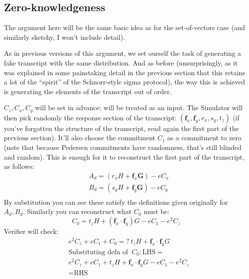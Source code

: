 \documentclass[10pt,a4paper]{article}
\begin{document}
\hypertarget{zero-knowledgeness}{%
\subsection[Zero-knowledgeness]{\texorpdfstring{\protect\hypertarget{anchor-40}{}{}Zero-knowledgeness}{Zero-knowledgeness}}\label{zero-knowledgeness}}

The argument here will be the same basic idea as for the set-of-vectors
case (and similarly sketchy, I won't include detail).

As in previous versions of this argument, we set ourself the task of
generating a fake transcript with the same distribution. And as before
(unsurprisingly, as it was explained in some painstaking detail in the
previous section that this retains a lot of the ``spirit'' of the
Schnorr-style sigma protocol), the way this is achieved is generating
the elements of the transcript out of order.

$C_z, C_x, C_y$ will be set in advance; will be treated as an input. The Simulator will
then pick randomly the response section of the transcript: $(\textbf{f}_x, \textbf{f}_y, r_x, s_y, t_z)$ (if you've
forgotten the structure of the transcript, read again the first part of
the previous section). It'll also choose the commitment $C_1$ as a commitment
to zero (note that because Pedersen commitments have randomness, that's
still blinded and random). This is enough for it to reconstruct the
first part of the transcript, as follows:
\begin{align*}
& A_d = \left(r_x H + \textbf{f}_x \textbf{G} \right) -eC_x \\
& B_d = \left(s_y H + \textbf{f}_y \textbf{G}\right) - eC_y \\
\end{align*}
By substitution you can see these satisfy the definitions given
originally for $A_d, B_d$. Similarly you can reconstruct what $C_0$ must be:
\[C_0 = t_z H + \left(\textbf{f}_x \cdot \textbf{f}_y \right)G -eC_1 - e^2 C_z \]
Verifier will check:
\begin{align*}
& e^2C_z + eC_1 + C_0 =?\  t_z H + \textbf{f}_x \cdot \textbf{f}_y G  \\
& \textrm{Substituting defn of } \ C_0 : \textrm{LHS}=\\
& e^2 C_z + eC_1 + t_zH + \textbf{f}_x \cdot \textbf{f}_y G - eC_1 - e^2C_z \\
& = \textrm{RHS} \\
\end{align*}
\end{document}
